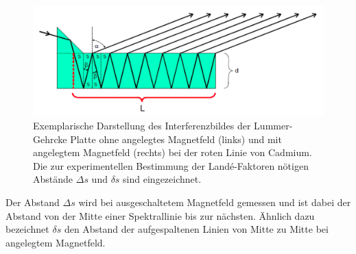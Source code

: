 \begin{figure}
  \centering
  \includegraphics[width=\textwidth]{data/lummer.png}
  \caption{Exemplarische Darstellung des Interferenzbildes der Lummer-Gehrcke Platte ohne angelegtes Magnetfeld (links) und mit angelegtem Magnetfeld (rechts) bei der roten Linie von Cadmium. Die zur experimentellen Bestimmung der Landé-Faktoren nötigen Abstände $\Delta s$ und $\delta s$ sind eingezeichnet. \cite{Versuchsanleitung}}
  \label{fig:abstaende}
\end{figure}

Der Abstand $\Delta s$ wird bei ausgeschaltetem Magnetfeld gemessen und ist dabei der Abstand von der Mitte einer Spektrallinie bis zur nächsten. Ähnlich dazu bezeichnet $\delta s$ den Abstand der aufgespaltenen Linien von Mitte zu Mitte bei angelegtem Magnetfeld.
